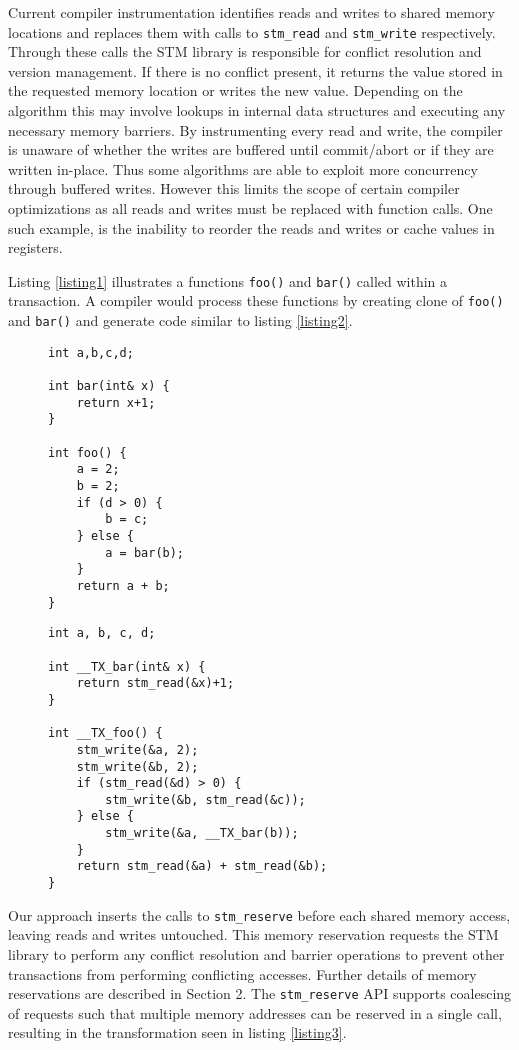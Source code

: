 \documentclass[preprint]{sigplanconf}
\begin{document}
Current compiler instrumentation identifies reads and writes to shared memory locations and replaces them with calls to \verb+stm_read+ and \verb+stm_write+ respectively. Through these calls the STM library is responsible for conflict resolution and version management. If there is no conflict present, it returns the value stored in the requested memory location or writes the new value. Depending on the algorithm this may involve lookups in internal data structures and executing any necessary memory barriers. By instrumenting every read and write, the compiler is unaware of whether the writes are buffered until commit/abort or if they are written in-place. Thus some algorithms are able to exploit more concurrency through buffered writes. However this limits the scope of certain compiler optimizations as all reads and writes must be replaced with function calls. One such example, is the inability to reorder the reads and writes or cache values in registers.

Listing \ref{listing1} illustrates a functions \verb+foo()+ and \verb+bar()+ called within a transaction. A compiler would process these functions by creating clone of \verb+foo()+ and \verb+bar()+ and generate code similar to listing \ref{listing2}.

\begin{figure}[h]
\begin{lstlisting}[caption={Example},label=listing1,captionpos=b]
int a,b,c,d;

int bar(int& x) {
    return x+1;
}

int foo() {
    a = 2;
    b = 2;
    if (d > 0) {
        b = c;
    } else {
        a = bar(b);
    }
    return a + b;
}
\end{lstlisting}
\end{figure}
\noindent

\begin{figure}[h]
\begin{lstlisting}[caption={Standard STM instrumentation},label=listing2,captionpos=b]
int a, b, c, d;

int __TX_bar(int& x) {
    return stm_read(&x)+1;
}

int __TX_foo() {
    stm_write(&a, 2);
    stm_write(&b, 2);
    if (stm_read(&d) > 0) {
        stm_write(&b, stm_read(&c));
    } else {
        stm_write(&a, __TX_bar(b));
    }
    return stm_read(&a) + stm_read(&b);
}
\end{lstlisting}
\end{figure}

Our approach inserts the calls to \verb+stm_reserve+ before each shared memory access, leaving reads and writes untouched. This memory reservation requests the STM library to perform any conflict resolution and barrier operations to prevent other transactions from performing conflicting accesses. Further details of memory reservations are described in Section 2. The \verb+stm_reserve+ API supports coalescing of requests such that multiple memory addresses can be reserved in a single call, resulting in the transformation seen in listing \ref{listing3}.
\end{document}
